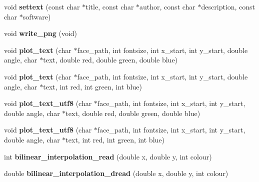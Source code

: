 \begin{DoxyCompactItemize}
\item 
\hypertarget{classpngwriter_a18b87a43acc76a449ae8b8aa5297185c}{}void {\bfseries settext} (const char $\ast$title, const char $\ast$author, const char $\ast$description, const char $\ast$software)\label{classpngwriter_a18b87a43acc76a449ae8b8aa5297185c}

\item 
\hypertarget{classpngwriter_a5153fc8d5288a7c72b6943d841cb7d1e}{}void {\bfseries write\+\_\+png} (void)\label{classpngwriter_a5153fc8d5288a7c72b6943d841cb7d1e}

\item 
\hypertarget{classpngwriter_a836d0bd7594a8adacd57b60dc0814526}{}void {\bfseries plot\+\_\+text} (char $\ast$face\+\_\+path, int fontsize, int x\+\_\+start, int y\+\_\+start, double angle, char $\ast$text, double red, double green, double blue)\label{classpngwriter_a836d0bd7594a8adacd57b60dc0814526}

\item 
\hypertarget{classpngwriter_a48f46767c2a94fcb999b73261bec8a6b}{}void {\bfseries plot\+\_\+text} (char $\ast$face\+\_\+path, int fontsize, int x\+\_\+start, int y\+\_\+start, double angle, char $\ast$text, int red, int green, int blue)\label{classpngwriter_a48f46767c2a94fcb999b73261bec8a6b}

\item 
\hypertarget{classpngwriter_a3d6cdd3945e3b7ce94a2a7c3c3660334}{}void {\bfseries plot\+\_\+text\+\_\+utf8} (char $\ast$face\+\_\+path, int fontsize, int x\+\_\+start, int y\+\_\+start, double angle, char $\ast$text, double red, double green, double blue)\label{classpngwriter_a3d6cdd3945e3b7ce94a2a7c3c3660334}

\item 
\hypertarget{classpngwriter_a77672f755151c21acce286dfb280a014}{}void {\bfseries plot\+\_\+text\+\_\+utf8} (char $\ast$face\+\_\+path, int fontsize, int x\+\_\+start, int y\+\_\+start, double angle, char $\ast$text, int red, int green, int blue)\label{classpngwriter_a77672f755151c21acce286dfb280a014}

\item 
\hypertarget{classpngwriter_a3def9bdac6da0ba338d9097d34d368b9}{}int {\bfseries bilinear\+\_\+interpolation\+\_\+read} (double x, double y, int colour)\label{classpngwriter_a3def9bdac6da0ba338d9097d34d368b9}

\item 
\hypertarget{classpngwriter_a8c99527a0e53fb2a9636ceec0c1138f6}{}double {\bfseries bilinear\+\_\+interpolation\+\_\+dread} (double x, double y, int colour)\label{classpngwriter_a8c99527a0e53fb2a9636ceec0c1138f6}


\end{DoxyCompactItemize}

